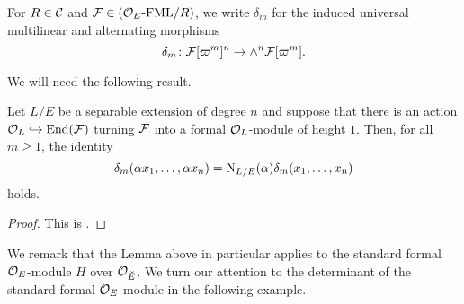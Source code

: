 \documentclass[../main.tex]{subfiles}
\begin{document}
For $R\in\mathcal{C}$ and $\mathcal{F} \in {({\mathcal{O}_E}\textnormal-\allowbreak\mathrm{FML}/{R})}$, we write
$\delta_m$ for the induced universal multilinear and alternating morphisms
\begin{equation}\label{eq:determinantontorsionpoints}
  \delta_m \colon \mathcal{F}[\varpi^m]^n \to \wedge^n\mathcal{F}[\varpi^m].
\end{equation}

We will need the following result.

\begin{lem}\label{lem:WeinsteinDeterminantAndNorm}
  Let $L/E$ be a separable extension of degree $n$ and suppose that there 
  is an action $\mathcal{O}_L \hookrightarrow \operatorname{End}(\mathcal{F})$ turning $\mathcal{F}$ into a formal
  $\mathcal{O}_L$-module of height $1$. Then, for all $m \geq 1$, the identity
  \begin{equation*}
    \delta_m(\alpha x_1, \dots, \alpha x_n) = \mathrm{N}_{L/E}(\alpha) \delta_m
    (x_1, \dots, x_n)
  \end{equation*}
  holds. 
  \begin{proof}
    This is \cite[Lemma 2.12]{weinstein2016semistable}.
  \end{proof}
\end{lem}

We remark that the Lemma above in particular applies to the standard formal 
$\mathcal{O}_E$-module $H$ over $\mathcal{O}_{\breve {E}}$. We turn our attention to the determinant of the standard
formal $\mathcal{O}_E$-module in the following example.
\end{document}
